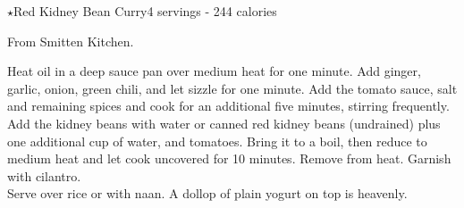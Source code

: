 \begin{recipe}{$\star$Red Kidney Bean Curry}{4 servings - 244 calories}{}

\freeform From Smitten Kitchen.


Heat oil in a deep sauce pan over medium heat for one minute. Add ginger, garlic, onion, green chili, and let sizzle for one minute. Add the tomato sauce, salt and remaining spices and cook for an additional five minutes, stirring frequently. Add the kidney beans with water or canned red kidney beans (undrained) plus one additional cup of water, and tomatoes. Bring it to a boil, then reduce to medium heat and let cook uncovered for 10 minutes. Remove from heat. Garnish with cilantro.\\

Serve over rice or with naan. A dollop of plain yogurt on top is heavenly.

\end{recipe}